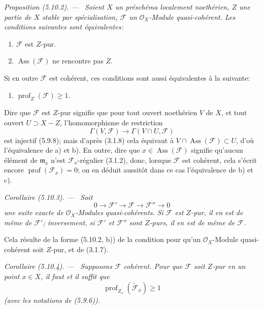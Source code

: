 \documentclass[10pt,oneside]{book}
\makeatletter
\newcommand{\oldpage}[2][]{%
  \setcounter{footnote}{0}%
  \marginpar{\scriptsize\textbf{#1}~|~#2}\ignorespaces}
\newenvironment{proposition}[1][]{%
  \par\medskip\noindent\itshape Proposition (#1). ---\ }{\par}
\newenvironment{corollary}[1][]{%
  \par\medskip\noindent\itshape Corollaire (#1). ---\ }{\par}
\newcommand{\EGAReaderTarget}[2]{\hypertarget{#1}{}\@bsphack\begingroup\def\@currentHref{#1}\label{#2}\endgroup\@esphack}
\makeatother
\begin{document}
\begin{proposition}[5.10.2]
\EGAReaderTarget{ega4.c04.prop.5-10-2}{IV.2.s5.10.2-fr}
Soient $X$ un préschéma localement noethérien, $Z$ une partie de $X$ stable
par spécialisation, $\mathcal F$ un $\mathcal O_X$-Module quasi-cohérent.
Les conditions suivantes sont équivalentes:
\begin{enumerate}
\item[a)] $\mathcal F$ est $Z$-pur.
\item[b)] $\operatorname{Ass}(\mathcal F)$ ne rencontre pas $Z$.
\end{enumerate}
Si en outre $\mathcal F$ est cohérent, ces conditions sont aussi équivalentes
à la suivante:
\begin{enumerate}
\item[c)] $\operatorname{prof}_Z(\mathcal F)\geq1$.
\end{enumerate}
\end{proposition}

Dire que $\mathcal F$ est $Z$-pur signifie que pour tout ouvert noethérien
$V$ de $X$, et tout ouvert $U\supset X-Z$, l'homomorphisme de restriction
\[
\Gamma(V,\mathcal F)\longrightarrow\Gamma(V\cap U,\mathcal F)
\]
est injectif (5.9.8); mais d'après (3.1.8) cela équivaut à
$V\cap\operatorname{Ass}(\mathcal F)\subset U$, d'où l'équivalence de a) et
b). En outre, dire que $x\in\operatorname{Ass}(\mathcal F)$ signifie
qu'aucun élément de $\mathfrak m_x$ n'est $\mathcal F_x$-régulier (3.1.2),
donc, lorsque $\mathcal F$ est cohérent, cela s'écrit encore
$\operatorname{prof}(\mathcal F_x)=0$; on en déduit aussitôt dans ce cas
l'équivalence de b) et c).

\begin{corollary}[5.10.3]
\label{IV.2.s5.10.3-fr}
Soit
\[
0\longrightarrow\mathcal F'\longrightarrow\mathcal F
\longrightarrow\mathcal F''\longrightarrow0
\]
une suite exacte de $\mathcal O_X$-Modules quasi-cohérents. Si $\mathcal F$
est $Z$-pur, il en est de même de $\mathcal F'$; inversement, si
$\mathcal F'$ et $\mathcal F''$ sont $Z$-purs, il en est de même de
$\mathcal F$.
\end{corollary}

\oldpage[IV-2]{115}

Cela résulte de la forme (5.10.2, b)) de la condition pour qu'un
$\mathcal O_X$-Module quasi-cohérent soit $Z$-pur, et de (3.1.7).

\begin{corollary}[5.10.4]
\label{IV.2.s5.10.4-fr}
Supposons $\mathcal F$ cohérent. Pour que $\mathcal F$ soit $Z$-pur en un
point $x\in X$, il faut et il suffit que
\[
\operatorname{prof}_{Z_x}(\widetilde{\mathcal F}_x)\geq1
\]
(avec les notations de (5.9.6)).
\end{corollary}
\end{document}
